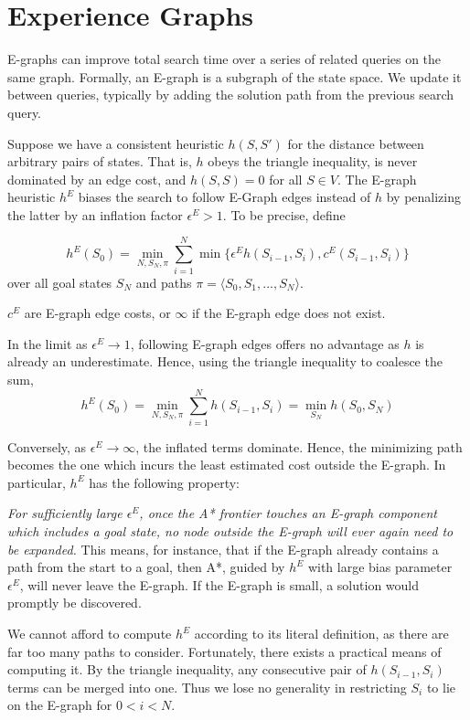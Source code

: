 \documentclass[letterpaper]{article}
\begin{document}
\section{Experience Graphs}

E-graphs can improve total search time over a series of related queries on the same graph.
Formally, an E-graph is a subgraph of the state space.
We update it between queries, typically by adding the solution path from the previous search query.

Suppose we have a consistent heuristic $h(S,S')$ for the distance between arbitrary pairs of states.
That is, $h$ obeys the triangle inequality, is never dominated by an edge cost, and $h(S,S) = 0$ for all $S\in V$.
The E-graph heuristic $h^E$ biases the search to follow E-Graph edges instead of $h$ by penalizing the latter by an inflation factor $\epsilon^E > 1$.
To be precise, define

\[h^E(S_0) = \min_{N,S_N,\pi} \sum_{i=1}^N \min \{\epsilon^E h(S_{i-1},S_i),c^E(S_{i-1},S_i)\}\]
over all goal states $S_N$ and paths $\pi = \langle S_0,S_1,...,S_N \rangle$.

$c^E$ are E-graph edge costs, or $\infty$ if the E-graph edge does not exist.

In the limit as $\epsilon^E \rightarrow 1$, following E-graph edges offers no advantage as $h$ is already an underestimate. Hence, using the triangle inequality to coalesce the sum,
\[h^E(S_0) = \min_{N,S_N,\pi} \sum_{i=1}^N h(S_{i-1},S_i) = \min_{S_N} h(S_0,S_N)\]

Conversely, as $\epsilon^E \rightarrow\infty$, the inflated terms dominate. Hence, the minimizing path becomes the one which incurs the least estimated cost outside the E-graph. In particular, $h^E$ has the following property:

\textit{For sufficiently large $\epsilon^E$, once the A* frontier touches an E-graph component which includes a goal state, no node outside the E-graph will ever again need to be expanded.} This means, for instance, that if the E-graph already contains a path from the start to a goal, then A*, guided by $h^E$ with large bias parameter $\epsilon^E$, will never leave the E-graph. If the E-graph is small, a solution would promptly be discovered.

We cannot afford to compute $h^E$ according to its literal definition, as there are far too many paths to consider. Fortunately, there exists a practical means of computing it. By the triangle inequality, any consecutive pair of $h(S_{i-1},S_i)$ terms can be merged into one. Thus we lose no generality in restricting $S_i$ to lie on the E-graph for $0 < i < N$.
\end{document}

